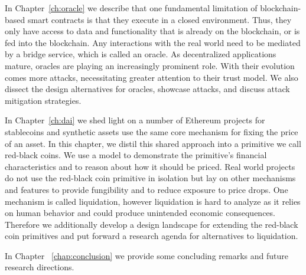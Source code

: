 In Chapter~\ref{ch:oracle} we describe that one fundamental limitation of blockchain-based smart contracts is that they execute in a closed environment. Thus, they only have access to data and functionality that is already on the blockchain, or is fed into the blockchain. Any interactions with the real world need to be mediated by a bridge service, which is called an oracle. As decentralized applications mature, oracles are playing an increasingly prominent role. With their evolution comes more attacks, necessitating greater attention to their trust model. We also dissect the design alternatives for oracles, showcase attacks, and discuss attack mitigation strategies.


In Chapter~\ref{ch:dai} we shed light on a number of Ethereum projects for stablecoins and synthetic assets use the same core mechanism for fixing the price of an asset. In this chapter, we distil this shared approach into a primitive we call red-black coins. We use a model to demonstrate the primitive's financial characteristics and to reason about how it should be priced. Real world projects do not use the red-black coin primitive in isolation but lay on other mechanisms and features to provide fungibility and to reduce exposure to price drops. One mechanism is called liquidation, however liquidation is hard to analyze as it relies on human behavior and could produce unintended economic consequences. Therefore we additionally develop a design landscape for extending the red-black coin primitives and put forward a research agenda for alternatives to liquidation.

In Chapter ~\ref{chap:conclusion} we provide some concluding remarks and future research directions.



%
%
%
